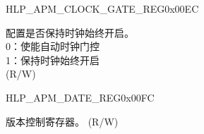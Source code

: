 \begin{register}{H}{LP\_APM\_CLOCK\_GATE\_REG}{0x00EC}\label{regdesc:LPAPMCLOCKGATEREG}
%
%
\regnewline%
\begin{regdesc}\begin{reglist}
\label{fielddesc:LPAPMCLKEN}\item [LP\_APM\_CLK\_EN] 配置是否保持时钟始终开启。\\ 
0：使能自动时钟门控 \\ 
1：保持时钟始终开启 \\ (R/W)
\end{reglist}\end{regdesc}
\end{register}


\begin{register}{H}{LP\_APM\_DATE\_REG}{0x00FC}\label{regdesc:LPAPMDATEREG}
%
%
\regnewline%
\begin{regdesc}\begin{reglist}
\label{fielddesc:LPAPMDATE}\item [LP\_APM\_DATE] 版本控制寄存器。 (R/W)
\end{reglist}\end{regdesc}
\end{register}


